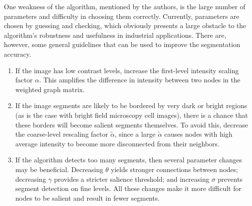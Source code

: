 \documentclass[12pt]{article}%
\begin{document}
One weakness of the algorithm, mentioned by the authors, is the large number of parameters and difficulty in choosing them correctly. Currently, parameters are chosen by guessing and checking, which obviously presents a large obstacle to the algorithm's robustness and usefulness in industrial applications. There are, however, some general guidelines that can be used to improve the segmentation accuracy.

\begin{enumerate}

\item If the image has low contrast levels, increase the first-level intensity scaling factor $\alpha$. This amplifies the difference in intensity between two nodes in the weighted graph matrix.

\item If the image segments are likely to be bordered by very dark or bright regions (as is the case with bright field microscopy cell images), there is a chance that these borders will become salient segments themselves. To avoid this, decrease the coarse-level rescaling factor $\tilde{\alpha}$, since a large $\tilde{\alpha}$ causes nodes with high average intensity to become more disconnected from their neighbors.

\item If the algorithm detects too many segments, then several parameter changes may be beneficial. Decreasing $\theta$ yields stronger connections between nodes; decreasing $\gamma$ provides a stricter salience threshold; and increasing $\sigma$ prevents segment detection on fine levels. All these changes make it more difficult for nodes to be salient and result in fewer segments.

\end{enumerate}
\end{document}
